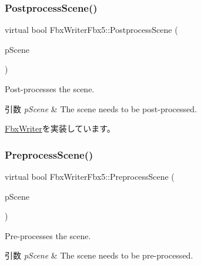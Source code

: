 \mbox{\label{class_fbx_writer_fbx5_a471fa8e52601150e6ec1926ef3e4f6b5}} 
\subsubsection{\texorpdfstring{Postprocess\+Scene()}{PostprocessScene()}}
{\footnotesize\ttfamily virtual bool Fbx\+Writer\+Fbx5\+::\+Postprocess\+Scene (\begin{DoxyParamCaption}\item[{\hyperlink{class_fbx_scene}{Fbx\+Scene} \&}]{p\+Scene }\end{DoxyParamCaption})\hspace{0.3cm}{\ttfamily [virtual]}}

Post-\/processes the scene. 
\begin{DoxyParams}{引数}
{\em p\+Scene} & The scene needs to be post-\/processed. \\
\hline
\end{DoxyParams}


\hyperlink{class_fbx_writer_a1cfdf59f72ebe777484862e4b64b5d65}{Fbx\+Writer}を実装しています。

\mbox{\label{class_fbx_writer_fbx5_a05b65bf878f38bd34ab9d4bb2e292abf}} 
\subsubsection{\texorpdfstring{Preprocess\+Scene()}{PreprocessScene()}}
{\footnotesize\ttfamily virtual bool Fbx\+Writer\+Fbx5\+::\+Preprocess\+Scene (\begin{DoxyParamCaption}\item[{\hyperlink{class_fbx_scene}{Fbx\+Scene} \&}]{p\+Scene }\end{DoxyParamCaption})\hspace{0.3cm}{\ttfamily [virtual]}}

Pre-\/processes the scene. 
\begin{DoxyParams}{引数}
{\em p\+Scene} & The scene needs to be pre-\/processed. \\
\hline
\end{DoxyParams}


